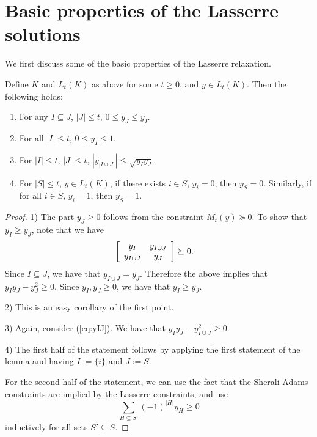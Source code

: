 \documentclass[a4paper,twoside,justified]{tufte-handout}
\begin{document}
\section{Basic properties of the Lasserre solutions}
We first discuss some of the basic properties of the Lasserre relaxation.
\begin{lemma}\label{lemma:basic-lasserre-prop}
  Define $K$ and $L_t(K)$ as above for some $t \ge 0$, and $y \in L_t(K)$.
  Then the following holds:
  \begin{enumerate}
    \item For any $I \subseteq J$, $|J| \le t$, $0 \le y_J \le y_I$.
    \item For all $|I| \le t$, $0 \le y_I \le 1$.
    \item For $|I| \le t$, $|J| \le t$, $|y_{|I \cup J|}| \le \sqrt{y_I y_J}$.
    \item For $|S| \le t$, $y \in L_t(K)$, 
      if there exists $i \in S$, $y_i=0$, then $y_S=0$.
      Similarly, if for all $i \in S$, $y_i=1$, then $y_S=1$.
  \end{enumerate}
\end{lemma}
\begin{proof}
  1) The part $y_J \ge 0$ follows from the constraint $M_t(y) \succeq 0$.
  To show that $y_I \ge y_J$, note that we have
  \begin{alignat}{2}
    \left[
    \begin{array}{c c}
      y_I & y_{I \cup J} \\
      y_{I \cup J} & y_J 
    \end{array}
    \right] &\succeq 0. \label{eq:yIJ}
  \end{alignat}
  Since $I \subseteq J$, we have that $y_{I \cup J} = y_{J}$.
  Therefore the above implies that $y_I y_J - y_J^2 \ge 0$.
  Since $y_I, y_J \ge 0$, we have that $y_I \ge y_J$.
  
  2) This is an easy corollary of the first point.

  3) Again, consider (\ref{eq:yIJ}). We have that 
  $y_I y_J - y_{I \cup J}^2 \ge 0$.

  4) The first half of the statement follows by applying the first statement
  of the lemma and having $I:=\{i\}$ and $J:=S$.

  For the second half of the statement, we can use the fact that the Sherali-Adams
  constraints are implied by the Lasserre constraints, and use
  \[
  \sum_{H \subseteq S'} (-1)^{|H|} y_H \ge 0
  \]
  inductively for all sets $S' \subseteq S$.
\end{proof}
\end{document}
